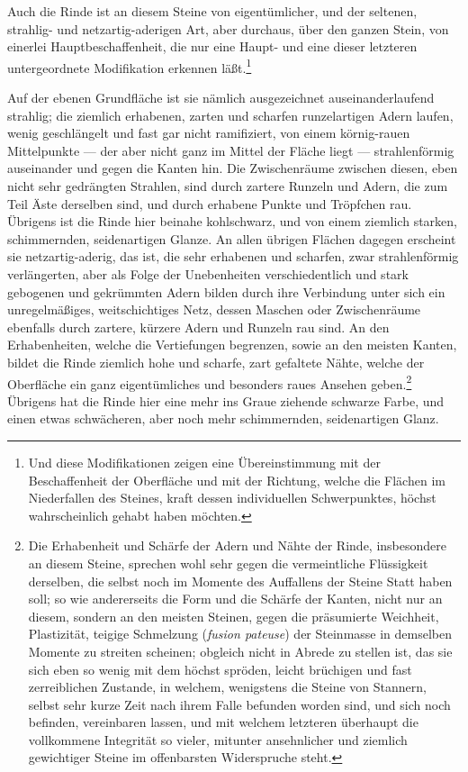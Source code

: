 \documentclass[a4paper, 11pt, oneside, german]{article}
\begin{document}
Auch die Rinde ist an diesem Steine von eigentümlicher, und der seltenen, strahlig- und netzartig-aderigen Art, aber durchaus, über den ganzen Stein, von einerlei Hauptbeschaffenheit, die nur eine Haupt- und eine dieser letzteren untergeordnete Modifikation erkennen läßt.\footnote{Und diese Modifikationen zeigen eine Übereinstimmung mit der Beschaffenheit der Oberfläche und mit der Richtung, welche die Flächen im Niederfallen des Steines, kraft dessen individuellen Schwerpunktes, höchst wahrscheinlich gehabt haben möchten.}

Auf der ebenen Grundfläche ist sie nämlich ausgezeichnet auseinanderlaufend strahlig; die ziemlich erhabenen, zarten und scharfen runzelartigen Adern laufen, wenig geschlängelt und fast gar nicht ramifiziert, von einem körnig-rauen Mittelpunkte --- der aber nicht ganz im Mittel der Fläche liegt --- strahlenförmig auseinander und gegen die Kanten hin. Die Zwischenräume zwischen diesen, eben nicht sehr gedrängten Strahlen, sind durch zartere Runzeln und Adern, die zum Teil Äste derselben sind, und durch erhabene Punkte und Tröpfchen rau. Übrigens ist die Rinde hier beinahe kohlschwarz, und von einem ziemlich starken, schimmernden, seidenartigen Glanze. An allen übrigen Flächen dagegen erscheint sie netzartig-aderig, das ist, die sehr erhabenen und scharfen, zwar strahlenförmig verlängerten, aber als Folge der Unebenheiten verschiedentlich und stark gebogenen und gekrümmten Adern bilden durch ihre Verbindung unter sich ein unregelmäßiges, weitschichtiges Netz, dessen Maschen oder Zwischenräume ebenfalls durch zartere, kürzere Adern und Runzeln rau sind. An den Erhabenheiten, welche die Vertiefungen begrenzen, sowie an den meisten Kanten, bildet die Rinde ziemlich hohe und scharfe, zart gefaltete Nähte, welche der Oberfläche ein ganz eigentümliches und besonders raues Ansehen geben.\footnote{Die Erhabenheit und Schärfe der Adern und Nähte der Rinde, insbesondere an diesem Steine, sprechen wohl sehr gegen die vermeintliche Flüssigkeit derselben, die selbst noch im Momente des Auffallens der Steine Statt haben soll; so wie andererseits die Form und die Schärfe der Kanten, nicht nur an diesem, sondern an den meisten Steinen, gegen die präsumierte Weichheit, Plastizität, teigige Schmelzung (\emph{fusion pateuse}) der Steinmasse in demselben Momente zu streiten scheinen; obgleich nicht in Abrede zu stellen ist, das sie sich eben so wenig mit dem höchst spröden, leicht brüchigen und fast zerreiblichen Zustande, in welchem, wenigstens die Steine von Stannern, selbst sehr kurze Zeit nach ihrem Falle befunden worden sind, und sich noch befinden, vereinbaren lassen, und mit welchem letzteren überhaupt die vollkommene Integrität so vieler, mitunter ansehnlicher und ziemlich gewichtiger Steine im offenbarsten Widerspruche steht.} Übrigens hat die Rinde hier eine mehr ins Graue ziehende schwarze Farbe, und einen etwas schwächeren, aber noch mehr schimmernden, seidenartigen Glanz.
\end{document}
